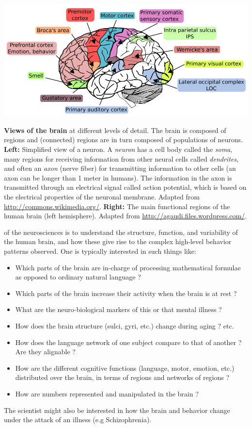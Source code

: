 \begin{pagefigure}
    \centering
    \def\svgwidth{.23\columnwidth}
    
    \includegraphics[width=.74\linewidth]{figures/brain_function.png}    
    \caption{\textbf{Views of the brain} at different levels of detail. The brain is composed of regions and (connected) regions are in turn composed of populations of neurons. \textbf{Left:} Simplified view of a neuron.
A \textit{neuron} has a cell body
called the \textit{soma}, many regions for receiving information from other neural cells
called \textit{dendrites}, and often an \textit{axon} (nerve
fiber) for transmitting information to other
cells (an axon can be longer than 1 meter in humans).
The information in the axon is transmitted through an electrical
signal called action potential, which is based on the electrical
properties of the neuronal membrane. Adapted from
\url{http://commons.wikimedia.org/}. \textbf{Right:}
The main functional regions of the human brain (left hemisphere).
Adapted from \url{http://agaudi.files.wordpress.com/}.}
\end{pagefigure}

 of the neurosciences is to understand the structure, function, and variability of the human brain, and how these give rise to the complex high-level behavior patterns observed. One is typically interested in such things like:
\begin{itemize}
  \item Which parts of the brain are in-charge of processing mathematical formulae as opposed to ordinary natural language ?
  \item Which parts of the brain increase their activity when the brain is at rest ?
  \item What are the neuro-biological markers of this or that mental illness ?
  \item How does the brain structure (sulci, gyri, etc.) change during aging ? etc.
 \item How does the language network of one subject compare to that of another ? Are they alignable ?
 \item How are the different cognitive functions (language, motor, emotion, etc.) distributed over the brain, in terms of regions and networks of regions ?
 \item How are numbers represented and manipulated in the brain ?
 \end{itemize}
 The scientist might also be interested in how the brain and behavior change under the attack of an illness (e.g Schizophrenia).


